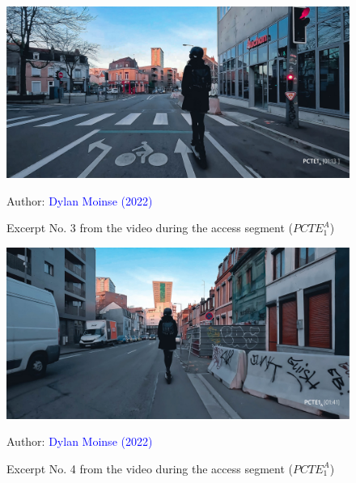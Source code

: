     \begin{figure}[h!]\vspace*{4pt}
        \caption*{Excerpt No. 3 from the video during the access segment (\(PCTE^{A}_{1}\))}
        \centerline{\includegraphics[width=0.75\columnwidth]{src/Figures/Annexes/Extrait_Video_PCTE1_Access_3.jpg}}
        \vspace{5pt}
        \begin{flushright}\scriptsize{
        Author: \textcolor{blue}{Dylan Moinse (2022)}
        }\end{flushright}
    \end{figure}

    \begin{figure}[h!]\vspace*{4pt}
        \caption*{Excerpt No. 4 from the video during the access segment (\(PCTE^{A}_{1}\))}
        \centerline{\includegraphics[width=0.75\columnwidth]{src/Figures/Annexes/Extrait_Video_PCTE1_Access_4.jpg}}
        \vspace{5pt}
        \begin{flushright}\scriptsize{
        Author: \textcolor{blue}{Dylan Moinse (2022)}
        }\end{flushright}
    \end{figure}

